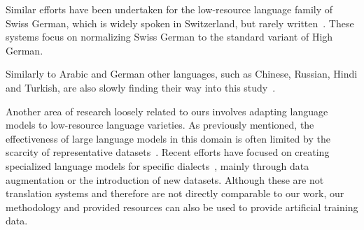 Similar efforts have been undertaken for the low-resource language family of Swiss German, which is widely spoken in Switzerland, but rarely written~\cite{Honnet2018,Scherrer2016}. 
These systems focus on normalizing Swiss German to the standard variant of High German.


Similarly to Arabic and German other languages, such as Chinese, Russian, Hindi and Turkish, are also slowly finding their way into this study~\cite{Wan2020,Kumar2021,Nguyen2017,Durrani2010}.


Another area of research loosely related to ours involves adapting language models to low-resource language varieties. 
As previously mentioned, the effectiveness of large language models in this domain is often limited by the scarcity of representative datasets~\cite{Alam2024}. 
Recent efforts have focused on creating specialized language models for specific dialects~\cite{Ondrejova2024,Faisal2024,Nguyen2024,Lopes2024}, mainly through data augmentation or the introduction of new datasets. 
Although these are not translation systems and therefore are not directly comparable to our work, our methodology and provided resources can also be used to provide artificial training data. 
